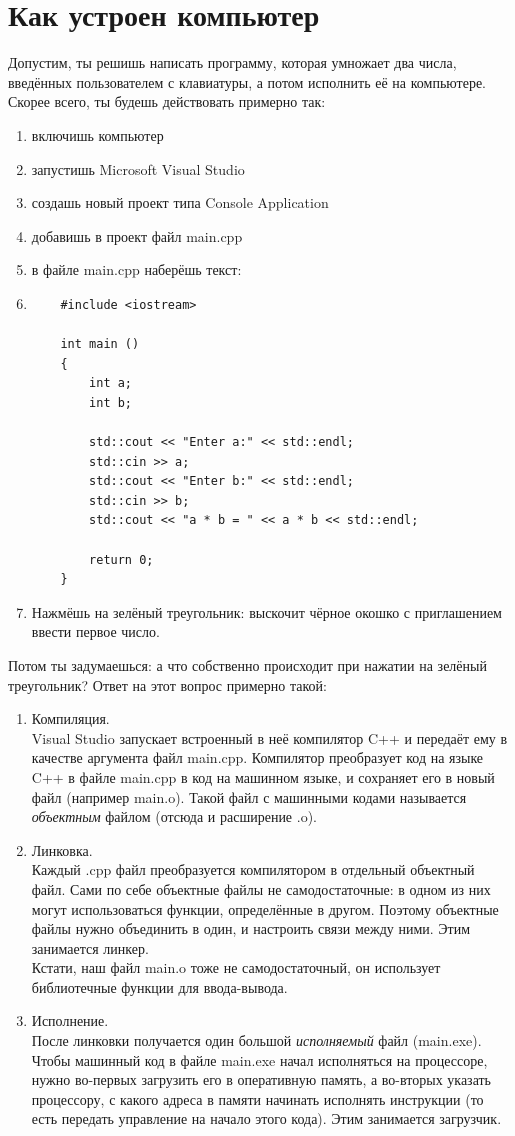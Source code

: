 \documentclass[11pt]{book}
\begin{document}
\chapter{Как устроен компьютер}
Допустим, ты решишь написать программу, которая умножает два числа,
введённых пользователем с клавиатуры, а потом исполнить её на компьютере.
Скорее всего, ты будешь действовать примерно так:
\begin{enumerate}
\item включишь компьютер
\item запустишь Microsoft Visual Studio
\item создашь новый проект типа Console Application
\item добавишь в проект файл main.cpp
\item в файле main.cpp наберёшь текст:
\item{
\begin{verbatim}
    #include <iostream>

    int main ()
    {
        int a;
        int b;

        std::cout << "Enter a:" << std::endl;
        std::cin >> a;
        std::cout << "Enter b:" << std::endl;
        std::cin >> b;
        std::cout << "a * b = " << a * b << std::endl;

        return 0;
    }
\end{verbatim}}
\item Нажмёшь на зелёный треугольник: выскочит чёрное окошко
    с приглашением ввести первое число.
\end{enumerate}
Потом ты задумаешься: а что собственно происходит при
нажатии на зелёный треугольник? Ответ на этот вопрос
примерно такой:
\begin{enumerate}
\item Компиляция.
\\
    Visual Studio запускает встроенный в неё компилятор C++ и передаёт
    ему в качестве аргумента файл main.cpp. Компилятор преобразует код
    на языке C++ в файле main.cpp в код на машинном языке, и сохраняет
    его в новый файл (например main.o). Такой файл с машинными кодами
    называется \emph{объектным} файлом (отсюда и расширение .o).
\item Линковка.
\\
    Каждый .cpp файл преобразуется компилятором в отдельный объектный файл.
    Сами по себе объектные файлы не самодостаточные:
    в одном из них могут использоваться функции, определённые в другом.
    Поэтому объектные файлы нужно объединить в один, и настроить связи
    между ними. Этим занимается линкер.
\\
    Кстати, наш файл main.o тоже не самодостаточный, он использует
    библиотечные функции для ввода-вывода.
\item Исполнение.
\\
    После линковки получается один большой \emph{исполняемый} файл (main.exe).
    Чтобы машинный код в файле main.exe начал исполняться на процессоре,
    нужно во-первых загрузить его в оперативную память, а во-вторых
    указать процессору, с какого адреса в памяти начинать исполнять инструкции
    (то есть передать управление на начало этого кода). Этим занимается загрузчик.
\end{enumerate}
\end{document}

